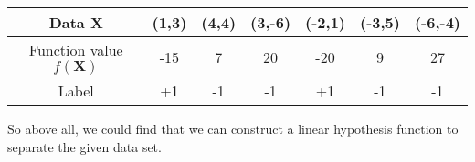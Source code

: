 \documentclass[10pt]{article}
\begin{document}
\begin{enumerate}[1.]
	\begin{table}[H]
		\centering
		\begin{tabular}{c|cccccc}
			Data $\mathbf{X}$ & (1,3) & (4,4) & (3,-6) & (-2,1) & (-3,5) & (-6,-4) \\ \hline
			Function value $f(\mathbf{X})$ & -15 & 7 & 20 & -20 & 9 & 27\\
			Label & +1 & -1 & -1 & +1 & -1 & -1
		\end{tabular}
		\label{tab:my_label}
	\end{table}

So above all, we could find that we can construct a linear hypothesis function to separate the given data set.\\
	
	\newpage


\end{enumerate}
\end{document}
